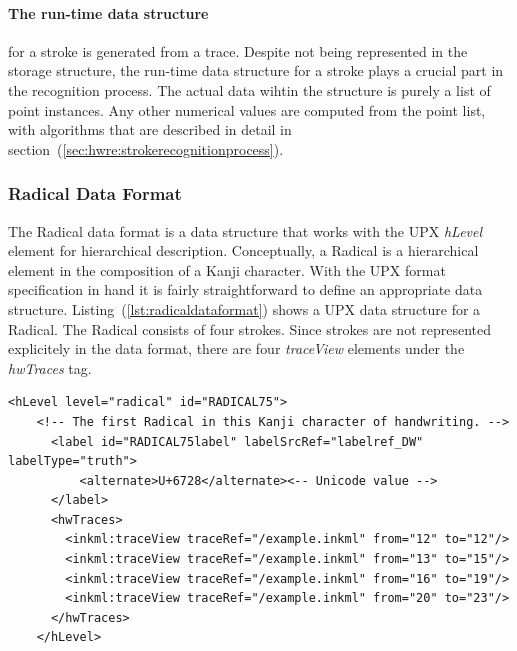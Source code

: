 \paragraph{The run-time data structure} for a stroke is generated from a trace.
Despite not being represented in the storage structure, the run-time data
structure for a stroke plays a crucial part in the recognition process.
The actual data wihtin the structure is purely a list of point instances. 
Any other numerical values are computed from the point list, with algorithms
that are described in detail in 
section~(\ref{sec:hwre:strokerecognitionprocess}).

\subsubsection{Radical Data Format}
\label{sec:hwre:radicaldataformat}

The Radical data format is a data structure that works with the UPX \emph{hLevel}
element for hierarchical description.
Conceptually, a Radical is a hierarchical element in the composition of a Kanji
character. With the UPX format specification in hand it is fairly 
straightforward to define an appropriate data structure.
Listing~(\ref{lst:radicaldataformat}) shows a UPX data structure for a Radical.
The Radical  consists of four strokes.
Since strokes are not represented explicitely in the data format,
there are four \emph{traceView} elements under the \emph{hwTraces} tag.
\begin{xmlcode}
  \begin{lstlisting}[emph={hLevel,hwTraces,label,alternative},
                     emphstyle=\color{blue}\textbf,
                     emph={[2]level,labelSrcRef,labelType,traceRef,from,to},
                     emphstyle={[2]\color{red}},
                     caption={A Radical representation in UPX},
                     label=lst:radicaldataformat]
    <hLevel level="radical" id="RADICAL75">
    <!-- The first Radical in this Kanji character of handwriting. -->
      <label id="RADICAL75label" labelSrcRef="labelref_DW" labelType="truth">
          <alternate>U+6728</alternate><-- Unicode value -->
      </label>
      <hwTraces>
        <inkml:traceView traceRef="/example.inkml" from="12" to="12"/>
        <inkml:traceView traceRef="/example.inkml" from="13" to="15"/>
        <inkml:traceView traceRef="/example.inkml" from="16" to="19"/>
        <inkml:traceView traceRef="/example.inkml" from="20" to="23"/>
      </hwTraces>
    </hLevel>
  \end{lstlisting}
\end{xmlcode}

